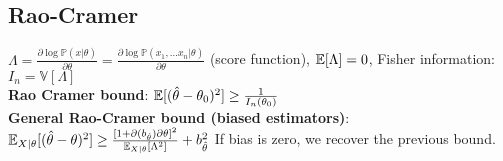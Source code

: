 \subsection*{Rao-Cramer}
$\Lambda = \frac{\partial \log \mathbb{P}(x|\theta )}{\partial \theta}=\frac{\partial \log \mathbb{P}(x_1,...x_n|\theta )}{\partial \theta}$ (score function), $\mathbb E[\Lambda ]=0$,
Fisher information: $I_n= \mathbb{V}[\Lambda]$ \\
\textbf{Rao Cramer bound}: $\mathbb E[(\hat{\theta}-\theta_0)^2]\geq \frac{1}{I_n(\theta_0)}$\\
\textbf{General Rao-Cramer bound (biased estimators)}:
$\mathbb E_{X|\theta}[(\hat \theta -\theta )^{2}] \geq \frac{[ 1+ \partial (b_{\hat \theta})\partial \theta]^{2}}{\mathbb E_{X|\theta}[\Lambda ^{2}]} + b_{\hat \theta}^{2}$ If bias is zero, we recover the previous bound.\\






